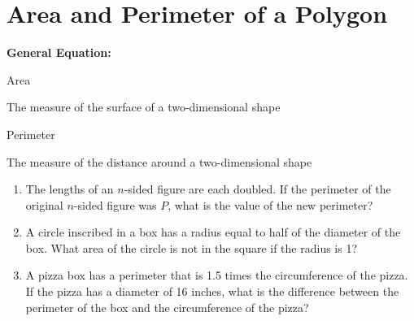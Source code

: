 \section[Polygons]{Area and Perimeter of a Polygon}
\textbf{General Equation:}

\begin{center}
\begin{multicols}{2}
\setlength{\columnseprule}{0pt}
Area

The measure of the surface of a two-dimensional shape

Perimeter

The measure of the distance around a two-dimensional shape
\end{multicols}
\end{center}

\vfill
\begin{enumerate}[labelindent=*,style=multiline,leftmargin=*,label=\textbf{Example \arabic*:}]
\item The lengths of an $n$-sided figure are each doubled. If the perimeter of the original $n$-sided figure was $P$, what is the value of the new perimeter?

\vfill\item A circle inscribed in a box has a radius equal to half of the diameter of the box. What area of the circle is not in the square if the radius is 1?

\vfill\item A pizza box has a perimeter that is 1.5 times the circumference of the pizza. If the pizza has a diameter of 16 inches, what is the difference between the perimeter of the box and the circumference of the pizza?
\end{enumerate}


